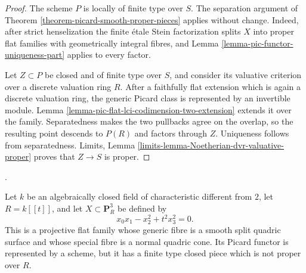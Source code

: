 \begin{proof}
The scheme $P$ is locally of finite type over $S$. The separation argument of
Theorem \ref{theorem-picard-smooth-proper-pieces} applies without change.
Indeed, after strict henselization the finite \'etale Stein factorization
splits $X$ into proper flat families with geometrically integral fibres, and
Lemma \ref{lemma-pic-functor-uniqueness-part} applies to every factor.

Let $Z\subset P$ be closed and of finite type over $S$, and consider its
valuative criterion over a discrete valuation ring $R$. After a faithfully
flat extension which is again a discrete valuation ring, the generic Picard
class is represented by an invertible module. Lemma
\ref{lemma-pic-flat-lci-codimension-two-extension} extends it over the family.
Separatedness makes the two pullbacks agree on the overlap, so the resulting
point descends to $P(R)$ and factors through $Z$. Uniqueness follows from
separatedness. Limits, Lemma
\ref{limits-lemma-Noetherian-dvr-valuative-proper} proves that $Z\to S$ is
proper.
\end{proof}

\begin{example}
\label{example-picard-quadric-cone-boundary}
\begin{reference}
\cite[Expos\'e 236, Remark 2.2, pp. 231--232]{FGA}.
\end{reference}
Let $k$ be an algebraically closed field of characteristic different from
$2$, let $R=k[[t]]$, and let $X\subset\mathbf P^3_R$ be defined by
$$
x_0x_1-x_2^2+t^2x_3^2=0.
$$
This is a projective flat family whose generic fibre is a smooth split
quadric surface and whose special fibre is a normal quadric cone. Its Picard
functor is represented by a scheme, but it has a finite type closed piece
which is not proper over $R$.
\end{example}

